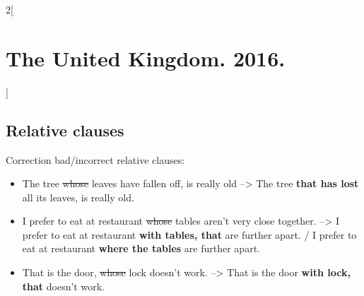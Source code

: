 \documentclass[10pt,a4paper]{article}
\newlength{\OriginalParIndent}
\newenvironment{ItemizeWithOrigParIndent}
    {\begin{itemize}[leftmargin=\OriginalParIndent]}
    {\end{itemize}}
\begin{document}
\begin{multicols}{2}[\section{The United Kingdom. 2016.}]
\subsection{Relative clauses}

Correction bad/incorrect relative clauses:
\begin{ItemizeWithOrigParIndent}
  \item The tree \sout{whose} leaves have fallen off, is really old --> The tree \textbf{that has lost} all its
  leaves, is really old.
  \item I prefer to eat at restaurant \sout{whose} tables aren't very close together. --> I prefer to eat at restaurant \textbf{with tables, that} are further apart. / I prefer to eat at restaurant \textbf{where the tables} are further apart.
  \item That is the door, \sout{whose} lock doesn't work. --> That is the door \textbf{with lock, that} doesn't work.
\end{ItemizeWithOrigParIndent}






\end{multicols}
\end{document}
